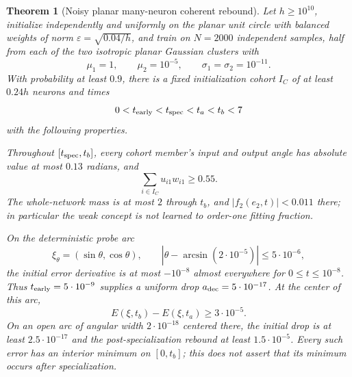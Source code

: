 \documentclass{article} %
\theoremstyle{plain}
\newtheorem{theorem}{Theorem}[section]
\theoremstyle{definition}
\theoremstyle{remark}
\begin{document}
\begin{theorem}[Noisy planar many-neuron coherent rebound]
\label{sbwide:theorem}
Let $h\ge10^{10}$, initialize independently and uniformly on the planar
unit circle with balanced weights of norm
$\varepsilon=\sqrt{0.04/h}$, and train on $N=2000$ independent samples,
half from each of the two isotropic planar Gaussian clusters with
\[
 \mu_1=1,\qquad \mu_2=10^{-5},\qquad
 \sigma_1=\sigma_2=10^{-11}.
\]
With probability at least $0.9$, there is a fixed initialization cohort
$I_C$ of at least $0.24h$ neurons and times
\[
 0<t_{\rm early}<t_{\rm spec}<t_a<t_b<7
\]
with the following properties.

Throughout $[t_{\rm spec},t_b]$, every cohort member's input and output
angle has absolute value at most $0.13$ radians, and
\[
 \sum_{i\in I_C}u_{i1}w_{i1}\ge0.55.
\]
The whole-network mass is at most $2$ through $t_b$, and
$|f_2(e_2,t)|<0.011$ there; in particular the weak concept is not learned
to order-one fitting fraction.

On the deterministic probe arc
\[
 \xi_\theta=(\sin\theta,\cos\theta),\qquad
 |\theta-\arcsin(2\cdot10^{-5})|\le5\cdot10^{-6},
\]
the initial error derivative is at most $-10^{-8}$ almost everywhere
for $0\le t\le10^{-8}$. Thus $t_{\rm early}=5\cdot10^{-9}$ supplies
a uniform drop $a_{\rm dec}=5\cdot10^{-17}$.
At the center of this arc,
\[
 E(\xi,t_b)-E(\xi,t_a)\ge3\cdot10^{-5}.
\]
On an open arc of angular width $2\cdot10^{-18}$ centered there,
the initial drop is at least $2.5\cdot10^{-17}$ and the
post-specialization rebound at least $1.5\cdot10^{-5}$.
Every such error has an interior minimum on $[0,t_b]$; this does not
assert that its minimum occurs after specialization.
\end{theorem}
\end{document}
